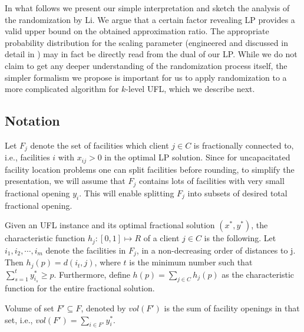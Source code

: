 \documentclass{llncs}
\begin{document}
In what follows we present our simple interpretation and sketch the analysis of the randomization by Li. We argue that a certain factor revealing LP provides a valid upper bound on the obtained approximation ratio. The appropriate probability distribution for the scaling parameter (engineered and discussed in detail in \cite{ShiLi}) may in fact be directly read from the dual of our LP. While we do not claim to get any deeper understanding of the randomization process itself, the simpler formalism we propose is important for us to apply randomization to a more complicated algorithm for $k$-level UFL, which we describe next.

\subsection{Notation}

Let $F_j$ denote the set of facilities which client $j \in C$ is fractionally connected to, i.e., facilities $i$ with $x_{ij} > 0$ in the optimal LP solution. Since for uncapacitated facility location problems one can split facilities before rounding, to simplify the presentation, we will assume that $F_j$ contains lots of facilities with very small fractional opening $y_i$. This will enable splitting $F_j$ into subsets of desired total fractional opening.

\begin{definition}
 Given an UFL instance and its optimal fractional solution $(x^*, y^*)$, the characteristic function $h_j : [0, 1] \longmapsto R$ of a client $j \in C$ is the following. Let $i_1, i_2, \cdots, i_m$ denote the facilities in $F_j$, in a non-decreasing order of distances to j. Then $h_j(p) = d(i_t, j)$, where $t$ is the minimum number such that $\sum_{s=1}^{t}y^*_{i_s} \geq p$. Furthermore, define $h(p) = \sum_{j \in C} h_j(p)$ as the characteristic function for the entire fractional solution.
\end{definition}

\begin{definition}
 Volume of set $F' \subseteq F$, denoted by $vol(F')$ is the sum of facility openings in that set, i.e., $vol(F') = \sum_{i \in F'} y^*_i$.
\end{definition}
\end{document}

